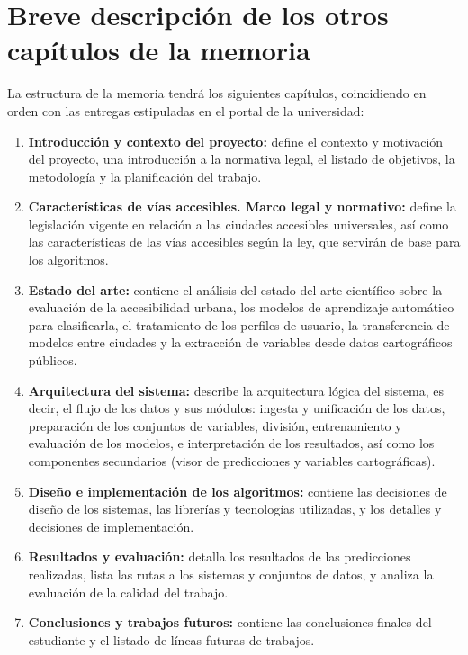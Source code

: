 \section{Breve descripción de los otros capítulos de la memoria}

La estructura de la memoria tendrá los siguientes capítulos, coincidiendo en orden con las entregas estipuladas en el portal de la universidad:

\begin{enumerate}
    \item \textbf{Introducción y contexto del proyecto:} define el contexto y motivación del proyecto, una introducción a la normativa legal, el listado de objetivos, la metodología y la planificación del trabajo.
    \item \textbf{Características de vías accesibles. Marco legal y normativo:} define la legislación vigente en relación a las ciudades accesibles universales, así como las características de las vías accesibles según la ley, que servirán de base para los algoritmos.
    \item \textbf{Estado del arte:} contiene el análisis del estado del arte científico sobre la evaluación de la accesibilidad urbana, los modelos de aprendizaje automático para clasificarla, el tratamiento de los perfiles de usuario, la transferencia de modelos entre ciudades y la extracción de variables desde datos cartográficos públicos.
    \item \textbf{Arquitectura del sistema:} describe la arquitectura lógica del sistema, es decir, el flujo de los datos y sus módulos: ingesta y unificación de los datos, preparación de los conjuntos de variables, división, entrenamiento y evaluación de los modelos, e interpretación de los resultados, así como los componentes secundarios (visor de predicciones y variables cartográficas).
    \item \textbf{Diseño e implementación de los algoritmos:} contiene las decisiones de diseño de los sistemas, las librerías y tecnologías utilizadas, y los detalles y decisiones de implementación.
    \item \textbf{Resultados y evaluación:} detalla los resultados de las predicciones realizadas, lista las rutas a los sistemas y conjuntos de datos, y analiza la evaluación de la calidad del trabajo.
    \item \textbf{Conclusiones y trabajos futuros:} contiene las conclusiones finales del estudiante y el listado de líneas futuras de trabajos.
\end{enumerate}

